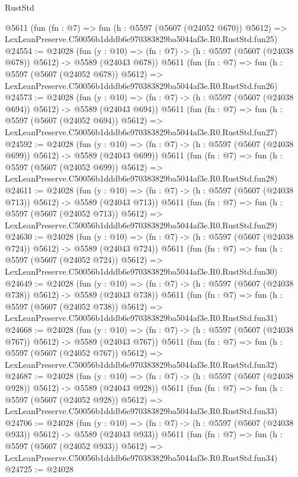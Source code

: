 \begin{lexlean}{RustStd}
\begin{coremodule}
    @5611
    (fun (fn : @7) =>
    fun (h : @5597 (@5607 (@24052 @670)) @5612) =>
    LexLeanPreserve.C50056b1dddb6e970383829ba5044af3e.R0.RustStd.fun25)
@24554 := @24028
    (fun (y : @10) => (fn : @7) -> (h : @5597 (@5607 (@24038 @678)) @5612) -> @5589 (@24043 @678))
    @5611
    (fun (fn : @7) =>
    fun (h : @5597 (@5607 (@24052 @678)) @5612) =>
    LexLeanPreserve.C50056b1dddb6e970383829ba5044af3e.R0.RustStd.fun26)
@24573 := @24028
    (fun (y : @10) => (fn : @7) -> (h : @5597 (@5607 (@24038 @694)) @5612) -> @5589 (@24043 @694))
    @5611
    (fun (fn : @7) =>
    fun (h : @5597 (@5607 (@24052 @694)) @5612) =>
    LexLeanPreserve.C50056b1dddb6e970383829ba5044af3e.R0.RustStd.fun27)
@24592 := @24028
    (fun (y : @10) => (fn : @7) -> (h : @5597 (@5607 (@24038 @699)) @5612) -> @5589 (@24043 @699))
    @5611
    (fun (fn : @7) =>
    fun (h : @5597 (@5607 (@24052 @699)) @5612) =>
    LexLeanPreserve.C50056b1dddb6e970383829ba5044af3e.R0.RustStd.fun28)
@24611 := @24028
    (fun (y : @10) => (fn : @7) -> (h : @5597 (@5607 (@24038 @713)) @5612) -> @5589 (@24043 @713))
    @5611
    (fun (fn : @7) =>
    fun (h : @5597 (@5607 (@24052 @713)) @5612) =>
    LexLeanPreserve.C50056b1dddb6e970383829ba5044af3e.R0.RustStd.fun29)
@24630 := @24028
    (fun (y : @10) => (fn : @7) -> (h : @5597 (@5607 (@24038 @724)) @5612) -> @5589 (@24043 @724))
    @5611
    (fun (fn : @7) =>
    fun (h : @5597 (@5607 (@24052 @724)) @5612) =>
    LexLeanPreserve.C50056b1dddb6e970383829ba5044af3e.R0.RustStd.fun30)
@24649 := @24028
    (fun (y : @10) => (fn : @7) -> (h : @5597 (@5607 (@24038 @738)) @5612) -> @5589 (@24043 @738))
    @5611
    (fun (fn : @7) =>
    fun (h : @5597 (@5607 (@24052 @738)) @5612) =>
    LexLeanPreserve.C50056b1dddb6e970383829ba5044af3e.R0.RustStd.fun31)
@24668 := @24028
    (fun (y : @10) => (fn : @7) -> (h : @5597 (@5607 (@24038 @767)) @5612) -> @5589 (@24043 @767))
    @5611
    (fun (fn : @7) =>
    fun (h : @5597 (@5607 (@24052 @767)) @5612) =>
    LexLeanPreserve.C50056b1dddb6e970383829ba5044af3e.R0.RustStd.fun32)
@24687 := @24028
    (fun (y : @10) => (fn : @7) -> (h : @5597 (@5607 (@24038 @928)) @5612) -> @5589 (@24043 @928))
    @5611
    (fun (fn : @7) =>
    fun (h : @5597 (@5607 (@24052 @928)) @5612) =>
    LexLeanPreserve.C50056b1dddb6e970383829ba5044af3e.R0.RustStd.fun33)
@24706 := @24028
    (fun (y : @10) => (fn : @7) -> (h : @5597 (@5607 (@24038 @933)) @5612) -> @5589 (@24043 @933))
    @5611
    (fun (fn : @7) =>
    fun (h : @5597 (@5607 (@24052 @933)) @5612) =>
    LexLeanPreserve.C50056b1dddb6e970383829ba5044af3e.R0.RustStd.fun34)
@24725 := @24028

\end{coremodule}
\end{lexlean}
